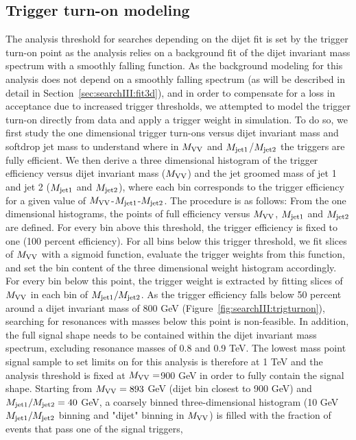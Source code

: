 \subsection{Trigger turn-on modeling}
\label{sec:searchIII:triggermodeling}
The analysis threshold for searches depending on the dijet fit is set by the trigger turn-on point as the analysis relies on a background fit of the dijet invariant mass spectrum with a smoothly falling function. As the background modeling for this analysis does not depend on a smoothly falling spectrum (as will be described in detail in Section~\ref{sec:searchIII:fit3d}), and in order to compensate for a loss in acceptance due to increased trigger thresholds, we attempted to model the trigger turn-on directly from data and apply a trigger weight in simulation.
To do so, we first study the one dimensional trigger turn-ons versus dijet invariant mass and softdrop jet mass to understand where in $M_{\rm VV}$ and $M_{\rm jet1}$/$M_{\rm jet2}$ the triggers are fully efficient. We then derive a three dimensional histogram of the trigger efficiency versus dijet invariant mass ($M_{\rm VV}$) and the jet groomed mass of jet 1 and jet 2 ($M_{\rm jet1}$ and $M_{\rm jet2}$), where each bin corresponds to the trigger efficiency for a given value of $M_{\rm VV}$-$M_{\rm jet1}$-$M_{\rm jet2}$. The procedure is as follows: From the one dimensional histograms, the points of full efficiency versus $M_{\rm VV}$, $M_{\rm jet1}$ and $M_{\rm jet2}$
are defined. For every bin above this threshold, the trigger efficiency is fixed to one (100 percent efficiency). For all bins below this trigger threshold, we fit slices of $M_{\rm VV}$ with a sigmoid function, evaluate the trigger weights from this function, and set the bin content of
the three dimensional weight histogram accordingly. For every bin below this point, the trigger weight is extracted by fitting slices of $M_{\rm VV}$ in each bin of $M_{\rm jet1}/M_{\rm jet2}$.
As the trigger efficiency falls below 50 percent around a dijet invariant mass of 800 GeV (Figure~\ref{fig:searchIII:trigturnon}), searching for resonances with masses below this point is non-feasible. In addition, the full signal shape needs to be contained within the dijet invariant mass spectrum, excluding resonance masses of 0.8 and 0.9 TeV. The lowest mass point signal sample to set limits on for this analysis is therefore at 1 TeV and the analysis threshold is fixed at $M_{\rm VV} = $900 GeV in order to fully contain the signal shape.
Starting from $M_{\rm VV}=893$ GeV (dijet bin closest to 900 GeV) and $M_{\rm jet1}/M_{\rm jet2}=40$ GeV, a coarsely binned three-dimensional histogram (10 GeV $M_{\rm jet1}/M_{\rm jet2}$ binning and "dijet" binning in $M_{\rm VV}$) is filled with the fraction of events that pass one of the signal triggers,
